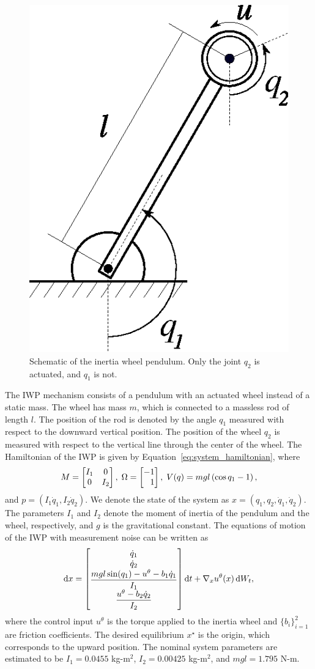 \begin{figure}[tb]
    \centering
    \includegraphics[width=0.25\linewidth]{figures/iwp.eps}
    \caption{Schematic of the inertia wheel pendulum. Only the joint $q_2$ is actuated, and $q_1$ is not.}
    \label{fig:iwp}
\end{figure}
%
The IWP mechanism consists of a pendulum with an actuated wheel instead of a
static mass.
%
The wheel has mass $m$, which is connected to a massless rod of length \(l\). 
%
The position of the rod is denoted by the angle \(q_1\) measured with
respect to the downward vertical position.
%
The position of the wheel \(q_2\) is measured with respect to the vertical
line through the center of the wheel.
%
The Hamiltonian of the IWP is given by Equation~\eqref{eq:system_hamiltonian}, where
%
\begin{equation*}
    M = \begin{bmatrix}I_1 & 0 \\ 0 & I_2\end{bmatrix},
    \;
    \Omega = \begin{bmatrix}-1 \\ \phantom{-}1\end{bmatrix},
    \;
    V(q) = mgl \left( \cos q_1 - 1 \right),
\end{equation*}
%
and $p = \left(I_1 \dot{q}_1,I_2 \dot{q}_2\right)$. 
%
We denote the state of the system as $x = (q_1, q_2, \dot{q}_1, \dot{q}_2)$.
%
The parameters \(I_1\) and \(I_2\) denote the moment of inertia of the pendulum
and the wheel, respectively, and \(g\) is the gravitational constant.
%
The equations of motion of the IWP with measurement noise can be written as 
%
\begin{equation}
    \operatorname{d}\! x = \begin{bmatrix}\dot{q}_1 \\ \dot{q}_2 \\ \dfrac{mgl \sin(q_1) - u^\theta - b_1\dot{q}_1}{I_1} \\ \dfrac{u^\theta - b_2 \dot{q}_2}{I_2}\end{bmatrix} \operatorname{d}\! t + \nabla_x u^\theta(x) \operatorname{d}\! W_t, 
    \label{eq:iwp_dynamics}
\end{equation}
%
where the control input \(u^\theta\) is the torque applied to the inertia wheel
and $\{b_i\}_{i=1}^2$ are friction coefficients.
%
The desired equilibrium $x^\star$ is the origin, which corresponds to the upward
position.
%
The nominal system parameters are estimated to be $I_1 = 0.0455$ kg-m$^2$, $I_2
= 0.00425$ kg-m$^2$, and $mgl = 1.795$ N-m. 
%
%

